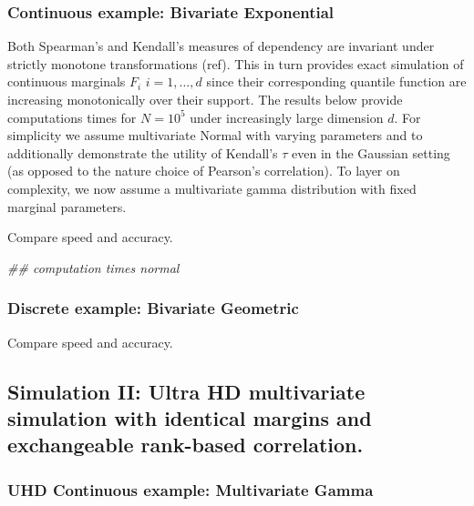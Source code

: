 \documentclass[
]{article}
\newenvironment{Shaded}{\begin{snugshade}}{\end{snugshade}}
\newcommand{\CommentTok}[1]{\textcolor[rgb]{0.56,0.35,0.01}{\textit{#1}}}
\begin{document}
\hypertarget{continuous-example-bivariate-exponential}{%
\subsubsection{Continuous example: Bivariate Exponential}\label{continuous-example-bivariate-exponential}}

Both Spearman's and Kendall's measures of dependency are invariant under
strictly monotone transformations (ref). This in turn provides exact simulation
of continuous marginals \(F_i\) \(i=1,\ldots,d\) since their corresponding quantile
function are increasing monotonically over their support. The results below
provide computations times for \(N=10^5\) under increasingly large dimension \(d\).
For simplicity we assume multivariate Normal with varying parameters and to
additionally demonstrate the utility of Kendall's \(\tau\) even in the Gaussian
setting (as opposed to the nature choice of Pearson's correlation). To layer on complexity, we now assume a multivariate gamma distribution with fixed marginal parameters.

Compare speed and accuracy.

\begin{Shaded}
\begin{Highlighting}[]
\CommentTok{## computation times normal}
\end{Highlighting}
\end{Shaded}

\hypertarget{discrete-example-bivariate-geometric}{%
\subsubsection{Discrete example: Bivariate Geometric}\label{discrete-example-bivariate-geometric}}

Compare speed and accuracy.

\hypertarget{simulation-ii-ultra-hd-multivariate-simulation-with-identical-margins-and-exchangeable-rank-based-correlation.}{%
\subsection{Simulation II: Ultra HD multivariate simulation with identical margins and exchangeable rank-based correlation.}\label{simulation-ii-ultra-hd-multivariate-simulation-with-identical-margins-and-exchangeable-rank-based-correlation.}}

\hypertarget{uhd-continuous-example-multivariate-gamma}{%
\subsubsection{UHD Continuous example: Multivariate Gamma}\label{uhd-continuous-example-multivariate-gamma}}
\end{document}
